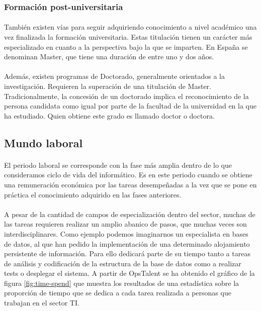 \documentclass[12pt, a4paper]{report}
\begin{document}
            \subsubsection{Formación post-universitaria}
            
        		\paragraph{}
                También existen vías para seguir adquiriendo conocimiento a nivel académico una vez finalizada la formación universitaria. Estas titulación tienen un carácter más especializado en cuanto a la perspectiva bajo la que se imparten. En España se denominan Master, que tiene una duración de entre uno y dos años.
                
                \paragraph{}
				Además, existen programas de Doctorado, generalmente orientados a la investigación. Requieren la superación de una titulación de Master. Tradicionalmente, la concesión de un doctorado implica el reconocimiento de la persona candidata como igual por parte de la facultad de la universidad en la que ha estudiado. Quien obtiene este grado es llamado doctor o doctora.
                


        \subsection{Mundo laboral}
        
        	\paragraph{}
            El periodo laboral se corresponde con la fase más amplia dentro de lo que consideramos ciclo de vida del informático. Es en este periodo cuando se obtiene una remuneración económica por las tareas desempeñadas a la vez que se pone en práctica el conocimiento adquirido en las fases anteriores.
            
            \paragraph{}
            A pesar de la cantidad de campos de especialización dentro del sector, muchas de las tareas requieren realizar un amplio abanico de pasos, que muchas veces son interdisciplinares. Como ejemplo podemos imaginarnos un especialista en bases de datos, al que han pedido la implementación de una determinado alojamiento persistente de información. Para ello dedicará parte de su tiempo tanto a tareas de análisis y codificación de la estructura de la base de datos como a realizar tests o desplegar el sistema. A partir de OpsTalent\cite{opstalent:keep-date} se ha obtenido el gráfico de la figura \ref{fig:time-spend} que muestra los resultados de una estadística sobre la proporción de tiempo que se dedica a cada tarea realizada a personas que trabajan en el sector TI.
           
\end{document}
